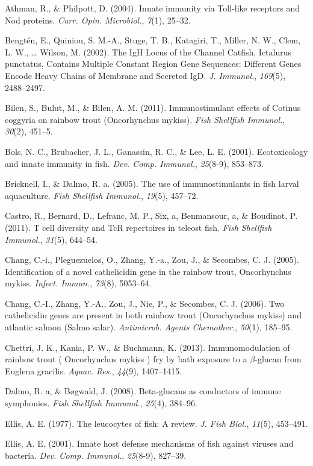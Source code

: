 \documentclass[11pt,a4paper,]{article}
\begin{document}
Athman, R., \& Philpott, D. (2004). Innate immunity via Toll-like
receptors and Nod proteins. \emph{Curr. Opin. Microbiol.}, \emph{7}(1),
25--32.

Bengtén, E., Quiniou, S. M.-A., Stuge, T. B., Katagiri, T., Miller, N.
W., Clem, L. W., \ldots{} Wilson, M. (2002). The IgH Locus of the
Channel Catfish, Ictalurus punctatus, Contains Multiple Constant Region
Gene Sequences: Different Genes Encode Heavy Chains of Membrane and
Secreted IgD. \emph{J. Immunol.}, \emph{169}(5), 2488--2497.

Bilen, S., Bulut, M., \& Bilen, A. M. (2011). Immunostimulant effects of
Cotinus coggyria on rainbow trout (Oncorhynchus mykiss). \emph{Fish
Shellfish Immunol.}, \emph{30}(2), 451--5.

Bols, N. C., Brubacher, J. L., Ganassin, R. C., \& Lee, L. E. (2001).
Ecotoxicology and innate immunity in fish. \emph{Dev. Comp. Immunol.},
\emph{25}(8-9), 853--873.

Bricknell, I., \& Dalmo, R. a. (2005). The use of immunostimulants in
fish larval aquaculture. \emph{Fish Shellfish Immunol.}, \emph{19}(5),
457--72.

Castro, R., Bernard, D., Lefranc, M. P., Six, a, Benmansour, a, \&
Boudinot, P. (2011). T cell diversity and TcR repertoires in teleost
fish. \emph{Fish Shellfish Immunol.}, \emph{31}(5), 644--54.

Chang, C.-i., Pleguezuelos, O., Zhang, Y.-a., Zou, J., \& Secombes, C.
J. (2005). Identification of a novel cathelicidin gene in the rainbow
trout, Oncorhynchus mykiss. \emph{Infect. Immun.}, \emph{73}(8),
5053--64.

Chang, C.-I., Zhang, Y.-A., Zou, J., Nie, P., \& Secombes, C. J. (2006).
Two cathelicidin genes are present in both rainbow trout (Oncorhynchus
mykiss) and atlantic salmon (Salmo salar). \emph{Antimicrob. Agents
Chemother.}, \emph{50}(1), 185--95.

Chettri, J. K., Kania, P. W., \& Buchmann, K. (2013). Immunomodulation
of rainbow trout ( Oncorhynchus mykiss ) fry by bath exposure to a
$\beta$-glucan from Euglena gracilis. \emph{Aquac. Res.}, \emph{44}(9),
1407--1415.

Dalmo, R. a, \& Bøgwald, J. (2008). Beta-glucans as conductors of immune
symphonies. \emph{Fish Shellfish Immunol.}, \emph{25}(4), 384--96.

Ellis, A. E. (1977). The leucocytes of fish: A review. \emph{J. Fish
Biol.}, \emph{11}(5), 453--491.

Ellis, A. E. (2001). Innate host defense mechanisms of fish against
viruses and bacteria. \emph{Dev. Comp. Immunol.}, \emph{25}(8-9),
827--39.
\end{document}
